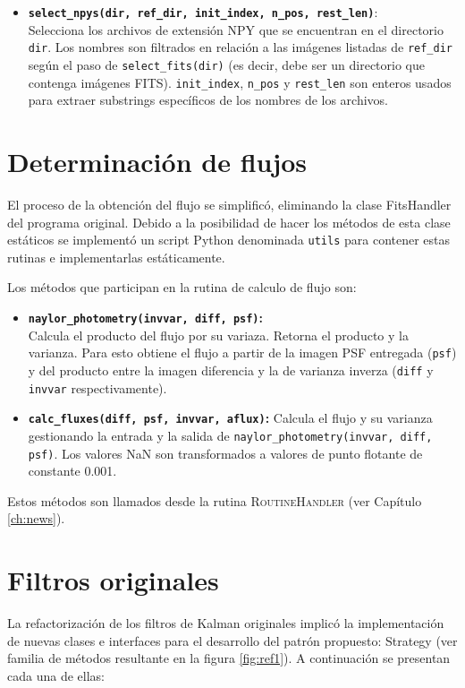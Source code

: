 \begin{itemize}
\item \textbf{\texttt{select\_npys(dir, ref\_dir, init\_index, n\_pos, rest\_len)}}:\\
Selecciona los archivos de extensi\'on NPY que se encuentran en el directorio \texttt{dir}. Los nombres son filtrados en relaci\'on a las im\'agenes listadas de \texttt{ref\_dir} seg\'un el paso de \texttt{select\_fits(dir)} (es decir, debe ser un directorio que contenga im\'agenes FITS). \texttt{init\_index}, \texttt{n\_pos} y \texttt{rest\_len} son enteros usados para extraer substrings espec\'ificos de los nombres de los archivos.
\end{itemize}

\section{Determinaci\'on de flujos}
El proceso de la obtenci\'on del flujo se simplific\'o, eliminando la clase FitsHandler del programa original. Debido a la posibilidad de hacer los m\'etodos de esta clase est\'aticos se implement\'o un script Python denominada \texttt{utils} para contener estas rutinas e implementarlas est\'aticamente.
\bigskip

Los m\'etodos que participan en la rutina de calculo de flujo son: 

\begin{itemize}
\item \textbf{\texttt{naylor\_photometry(invvar, diff, psf)}\cite{naylor}:}\\
Calcula el producto del flujo por su variaza. Retorna el producto y la varianza. Para esto obtiene el flujo a partir de la imagen PSF entregada (\texttt{psf}) y del producto entre la imagen diferencia y la de varianza inverza (\texttt{diff} y \texttt{invvar} respectivamente).
\bigskip


\item \textbf{\texttt{calc\_fluxes(diff, psf, invvar, aflux)}:}
Calcula el flujo y su varianza gestionando la entrada y la salida de \texttt{naylor\_photometry(invvar, diff, psf)}. Los valores NaN son transformados a valores de punto flotante de constante 0.001.
\end{itemize} 

Estos m\'etodos  son llamados desde la rutina \textsc{RoutineHandler} (ver Cap\'itulo \ref{ch:news}).
\section{Filtros originales}
La refactorizaci\'on de los filtros de Kalman originales implic\'o la implementaci\'on de nuevas clases e interfaces para el desarrollo del patr\'on propuesto: Strategy (ver familia de m\'etodos resultante en la figura \ref{fig:ref1}). A continuaci\'on se presentan cada una de ellas:

